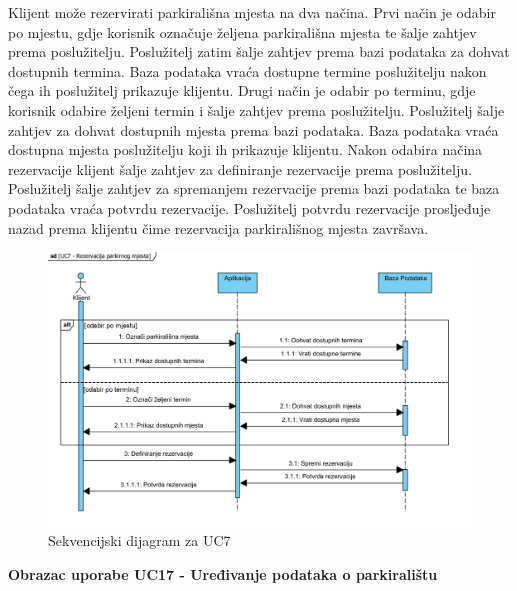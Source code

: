 				Klijent može rezervirati parkirališna mjesta na dva načina. Prvi način je odabir po mjestu, gdje korisnik označuje željena parkirališna mjesta te šalje zahtjev prema poslužitelju. Poslužitelj zatim šalje zahtjev prema bazi podataka za dohvat dostupnih termina. Baza podataka vraća dostupne termine poslužitelju nakon čega ih poslužitelj prikazuje klijentu. Drugi način je odabir po terminu, gdje korisnik odabire željeni termin i šalje zahtjev prema poslužitelju. Poslužitelj šalje zahtjev za dohvat dostupnih mjesta prema bazi podataka. Baza podataka vraća dostupna mjesta poslužitelju koji ih prikazuje klijentu. Nakon odabira načina rezervacije klijent šalje zahtjev za definiranje rezervacije prema poslužitelju. Poslužitelj šalje zahtjev za spremanjem rezervacije prema bazi podataka te baza podataka vraća potvrdu rezervacije. Poslužitelj potvrdu rezervacije prosljeđuje nazad prema klijentu čime rezervacija parkirališnog mjesta završava.
				  
				\vspace{1cm}
				
				\begin{figure}[H]
					\centering
					\includegraphics[width=\textwidth]{slike/SD_UC7.JPG} 
					\caption{Sekvencijski dijagram za UC7}
					\label{fig:promjene10} 
				\end{figure}
				
				\vspace{1cm}
			
				\textbf {Obrazac uporabe UC17 - Uređivanje podataka o parkiralištu}
				
				\vspace{1cm}
				
